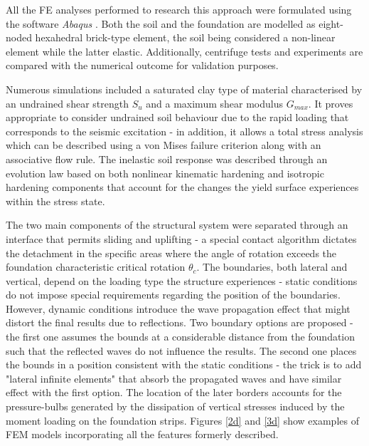 \documentclass[12pt,a4paper]{report}
\begin{document}
All the FE analyses performed to research this approach were formulated using the software \textit{Abaqus} \cite{manualversion}. Both the soil and the foundation are modelled as eight-noded hexahedral brick-type element, the soil being considered a non-linear element while the latter elastic. Additionally, centrifuge tests and experiments are compared with the numerical outcome for validation purposes.

Numerous simulations included a saturated clay type of material characterised by an undrained shear strength $S_u$ and a maximum shear modulus $G_{max}$. It proves appropriate to consider undrained soil behaviour due to the rapid loading that corresponds to the seismic excitation - in addition, it allows a total stress analysis which can be described using a von Mises failure criterion along with an associative flow rule. The inelastic soil response was described through an evolution law based on both nonlinear kinematic hardening and isotropic hardening components that account for the changes the yield surface experiences within the stress state.

The two main components of the structural system were separated through an interface that permits sliding and uplifting - a special contact algorithm dictates the detachment in the specific areas where the angle of rotation exceeds the foundation characteristic critical rotation $\theta_c$. The boundaries, both lateral and vertical, depend on the loading type the structure experiences - static conditions do not impose special requirements regarding the position of the boundaries. However, dynamic conditions introduce the wave propagation effect that might distort the final results due to reflections. Two boundary options are proposed - the first one assumes the bounds at a considerable distance from the foundation such that the reflected waves do not influence the results. The second one places the bounds in a position consistent with the static conditions - the trick is to add "lateral infinite elements" that absorb the propagated waves and have similar effect with the first option. The location of the later borders accounts for the pressure-bulbs generated by the dissipation of vertical stresses induced by the moment loading on the foundation strips. Figures \ref{2d} and \ref{3d} show examples of FEM models incorporating all the features formerly described.
\end{document}
